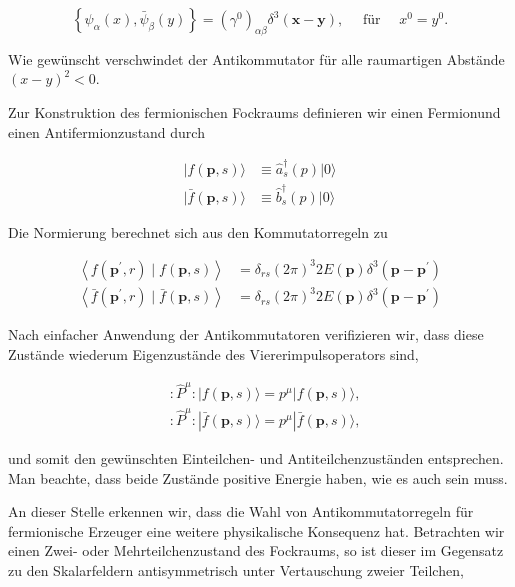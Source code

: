 \documentclass[10pt, letterpaper]{article}
\begin{document}
$$
\left\{\psi_{\alpha}(x), \bar{\psi}_{\beta}(y)\right\}=\left(\gamma^{0}\right)_{\alpha \beta} \delta^{3}(\mathbf{x}-\mathbf{y}), \quad \text { für } \quad x^{0}=y^{0} .
$$

Wie gewünscht verschwindet der Antikommutator für alle raumartigen Abstände $(x-y)^{2}<0$.

Zur Konstruktion des fermionischen Fockraums definieren wir einen Fermionund einen Antifermionzustand durch

$$
\begin{aligned}
|f(\mathbf{p}, s)\rangle & \equiv \hat{a}_{s}^{\dagger}(p)|0\rangle \\
|\bar{f}(\mathbf{p}, s)\rangle & \equiv \hat{b}_{s}^{\dagger}(p)|0\rangle
\end{aligned}
$$

Die Normierung berechnet sich aus den Kommutatorregeln zu

$$
\begin{aligned}
\left\langle f\left(\mathbf{p}^{\prime}, r\right) \mid f(\mathbf{p}, s)\right\rangle & =\delta_{r s}(2 \pi)^{3} 2 E(\mathbf{p}) \delta^{3}\left(\mathbf{p}-\mathbf{p}^{\prime}\right) \\
\left\langle\bar{f}\left(\mathbf{p}^{\prime}, r\right) \mid \bar{f}(\mathbf{p}, s)\right\rangle & =\delta_{r s}(2 \pi)^{3} 2 E(\mathbf{p}) \delta^{3}\left(\mathbf{p}-\mathbf{p}^{\prime}\right)
\end{aligned}
$$

Nach einfacher Anwendung der Antikommutatoren verifizieren wir, dass diese Zustände wiederum Eigenzustände des Viererimpulsoperators sind,

$$
\begin{aligned}
& : \hat{P}^{\mu}:|f(\mathbf{p}, s)\rangle=p^{\mu}|f(\mathbf{p}, s)\rangle, \\
& : \hat{P}^{\mu}:|\bar{f}(\mathbf{p}, s)\rangle=p^{\mu}|\bar{f}(\mathbf{p}, s)\rangle,
\end{aligned}
$$

und somit den gewünschten Einteilchen- und Antiteilchenzuständen entsprechen. Man beachte, dass beide Zustände positive Energie haben, wie es auch sein muss.

An dieser Stelle erkennen wir, dass die Wahl von Antikommutatorregeln für fermionische Erzeuger eine weitere physikalische Konsequenz hat. Betrachten wir einen Zwei- oder Mehrteilchenzustand des Fockraums, so ist dieser im Gegensatz zu den Skalarfeldern antisymmetrisch unter Vertauschung zweier Teilchen,
\end{document}
